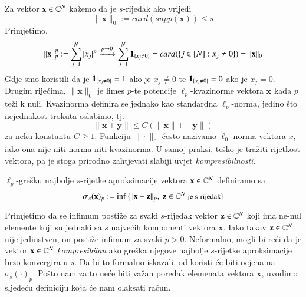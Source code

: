 \documentclass[a4paper,twoside,12pt]{memoir} %
\newcommand{\vect}[1]{\mathbf{#1}}
\begin{document}
\noindent Za vektor $\vect{x}\in\C^{N}$ ka\v{z}emo da je $s$-rijedak ako vrijedi $$\|\vect{x}\|_0 := card(supp(\vect{x})) \leq s$$
Primjetimo,
$$\|\vect{x}\|_p^p := \sum_{j=1}^N|x_j|^p \xrightarrow{p\rightarrow 0} \sum_{j=1}^N\bold{1}_{\{x_j \neq 0\}} = card(\{j \in [N]:x_j \neq 0\}) = \|\vect{x}\|_0$$
Gdje smo koristili da je $\bold{1}_{\{x_j \neq 0\}} = 1$  ako je $x_j \neq 0$ te $\bold{1}_{\{x_j \neq 0\}} = 0$  ako je $x_j = 0$. Drugim rije\v{c}ima, $\|\vect{x}\|_0$ je limes $p$-te potencije $\ell_p$-kvazinorme vektora $\vect{x}$ kada $p$ te\v{z}i k nuli. Kvazinorma definira se jednako kao standardna $\ell_p$-norma, jedino \v{s}to nejednakost trokuta oslabimo, tj. 
$$\|\vect{x}+\vect{y}\|\leq C(\|\vect{x}\|+\|\vect{y}\|)$$ 
za neku konstantu $C \geq 1$.
Funkciju $\|\cdot\|_0$ \v{c}esto nazivamo $\ell_0$-norma vektora $x$, iako  ona nije niti norma niti kvazinorma. U samoj praksi, te\v{s}ko je tra\v{z}iti rijetkost vektora, pa je stoga prirodno zahtjevati slabiji uvjet \textit{kompresibilnosti}.  
\begin{defn}
    $\ell_p$-gre\v{s}ku najbolje $s$-rijetke aproksimacije vektora $\vect{x}\in\C^{N}$ definiramo sa 
    $$\sigma_s(\vect{x})_p := \inf\big\{\|\vect{x}-\vect{z}\|_p,\ \vect{z} \in \C^{N} \ \small{\text{je s-rijedak}}\big\}$$
\end{defn}
\indent Primjetimo da se infimum posti\v{z}e za svaki $s$-rijedak vektor $\vect{z} \in \C^{N}$ koji ima ne-nul elemente koji su jednaki sa $s$ najve\'cih komponenti vektora $\vect{x}$. Iako takav $\vect{z} \in \C^{N}$ nije jedinstven, on posti\v{z}e infimum za svaki $p > 0$. Neformalno, mogli bi re\'ci da je vektor $\vect{x} \in \C^{N}$ \textit{kompresibilan} ako gre\v{s}ka njegove najbolje $s$-rijetke aproksimacije brzo konvergira u $s$. Da bi to formalno iskazali, od koristi \'ce biti ocjena na $\sigma_s(\cdot)_p$. Po\v{s}to nam za to ne\'ce biti va\v{z}an poredak elemenata vektora $\vect{x}$, uvodimo sljede\'cu definiciju koja \'ce nam olaksati ra\v{c}un.
\end{document}
